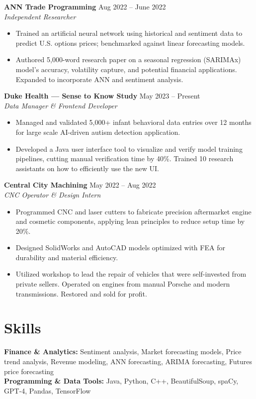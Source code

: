 \documentclass[11pt]{article}
\begin{document}
\textbf{ANN Trade Programming} \hfill Aug 2022 -- June 2022\\
\textit{Independent Researcher}
\begin{itemize}
    \item Trained an artificial neural network using historical and sentiment data to predict U.S. options prices; benchmarked against linear forecasting models.
    \item Authored 5,000-word research paper on a seasonal regression (SARIMAx) model's accuracy, volatility capture, and potential financial applications. Expanded to incorporate ANN and sentiment analysis.
\end{itemize}

\textbf{Duke Health --- Sense to Know Study} \hfill May 2023 -- Present\\
\textit{Data Manager \& Frontend Developer}
\begin{itemize}
    \item Managed and validated 5,000+ infant behavioral data entries over 12 months for large scale AI-driven autism detection application.
    \item Developed a Java user interface tool to visualize and verify model training pipelines, cutting manual verification time by 40\%. Trained 10 research assistants on how to efficiently use the new UI.
\end{itemize}

\textbf{Central City Machining} \hfill May 2022 -- Aug 2022\\
\textit{CNC Operator \& Design Intern}
\begin{itemize}
    \item Programmed CNC and laser cutters to fabricate precision aftermarket engine and cosmetic components, applying lean principles to reduce setup time by 20\%.
    \item Designed SolidWorks and AutoCAD models optimized with FEA for durability and material efficiency.
    \item Utilized workshop to lead the repair of vehicles that were self-invested from private sellers. Operated on engines from manual Porsche and modern transmissions. Restored and sold for profit.
\end{itemize}

\section*{Skills}
\textbf{Finance \& Analytics:} Sentiment analysis, Market forecasting models, Price trend analysis, Revenue modeling, ANN forecasting, ARIMA forecasting, Futures price forecasting\\
\textbf{Programming \& Data Tools:} Java, Python, C++, BeautifulSoup, spaCy, GPT-4, Pandas, TensorFlow
\end{document}
